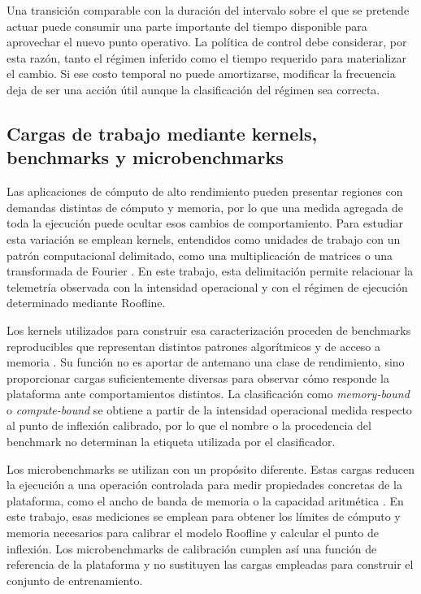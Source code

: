 Una transición comparable con la duración del intervalo sobre el que se
pretende actuar puede consumir una parte importante del tiempo disponible para
aprovechar el nuevo punto operativo. La política de control debe considerar,
por esta razón, tanto el régimen inferido como el tiempo requerido para
materializar el cambio. Si ese costo temporal no puede amortizarse, modificar
la frecuencia deja de ser una acción útil aunque la clasificación del régimen
sea correcta.

\subsection{Cargas de trabajo mediante kernels, benchmarks y microbenchmarks}
\label{sec:marco-cargas}

Las aplicaciones de cómputo de alto rendimiento pueden presentar regiones con
demandas distintas de cómputo y memoria, por lo que una medida agregada de toda
la ejecución puede ocultar esos cambios de comportamiento. Para estudiar esta
variación se emplean kernels, entendidos como unidades de trabajo con un patrón
computacional delimitado, como una multiplicación de matrices o una
transformada de Fourier \cite{Williams2009}. En este trabajo, esta delimitación
permite relacionar la telemetría observada con la intensidad operacional y con
el régimen de ejecución determinado mediante Roofline.

Los kernels utilizados para construir esa caracterización proceden de
benchmarks reproducibles que representan distintos patrones algorítmicos y de
acceso a memoria \cite[Ch.~12]{Gregg2020}. Su función no es aportar de antemano
una clase de rendimiento, sino proporcionar cargas suficientemente diversas
para observar cómo responde la plataforma ante comportamientos distintos. La
clasificación como \textit{memory-bound} o \textit{compute-bound} se obtiene a
partir de la intensidad operacional medida respecto al punto de inflexión
calibrado, por lo que el nombre o la procedencia del benchmark no determinan la
etiqueta utilizada por el clasificador.

Los microbenchmarks se utilizan con un propósito diferente. Estas cargas
reducen la ejecución a una operación controlada para medir propiedades
concretas de la plataforma, como el ancho de banda de memoria o la capacidad
aritmética \cite[Ch.~12]{Gregg2020}. En este trabajo, esas mediciones se
emplean para obtener los límites de cómputo y memoria necesarios para calibrar
el modelo Roofline y calcular el punto de inflexión. Los microbenchmarks de
calibración cumplen así una función de referencia de la plataforma y no
sustituyen las cargas empleadas para construir el conjunto de entrenamiento.
